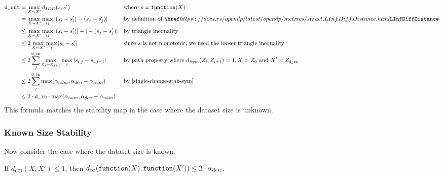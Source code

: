 \documentclass{article}
\begin{document}
\begin{align*}
    \dout &= \max\limits_{X \sim X'} d_{IDD}(s, s') &&\text{where } s = \function(X)\\
    &= \max\limits_{X \sim X'} \max\limits_{ij} |(s_i - s'_i) - (s_j - s'_j)| &&\text{by definition of }\rustdoc{metrics/struct}{LInfDiffDistance} \\
    &\le \max\limits_{X \sim X'} \max\limits_{ij} |(s_i - s'_i)| + |- (s_j - s'_j)| &&\text{by triangle inequality} \\
    &\leq 2 \max\limits_{X \sim X'} \max\limits_{i} |s_i - s'_i| &&\text{since $s$ is not monotonic, we used the looser triangle inequality}\\
    &\leq 2 \sum_j^{\din} \max\limits_{Z_{j} \sim Z_{j+1}} \max\limits_{i} |s_{i,j} - s_{i,j+1}| &&\text{by path property where } d_{Sym}(Z_i, Z_{i+1}) = 1, X = Z_0 \text{ and } X' = Z_\din \\
    &\leq 2 \sum_j^{\din} \max(\alpha_{num}, \alpha_{den} - \alpha_{num}) &&\text{by \ref{single-change-stab-sym}} \\
    &\leq 2 \cdot \din \cdot \max(\alpha_{num}, \alpha_{den} - \alpha_{num}) \\
\end{align*}
\label{sec:unknown-size}
This formula matches the stability map in the case where the dataset size is unknown.


\subsubsection{Known Size Stability}
\label{sec:known-size}
Now consider the case where the dataset size is known.

\begin{lemma}
    \label{single-change-stab}
    If $d_{CO}(X, X') \le 1$, then $d_\infty(\texttt{function}(X), \texttt{function}(X')) \le 2 \cdot \alpha_{den}$.
\end{lemma}
\end{document}
